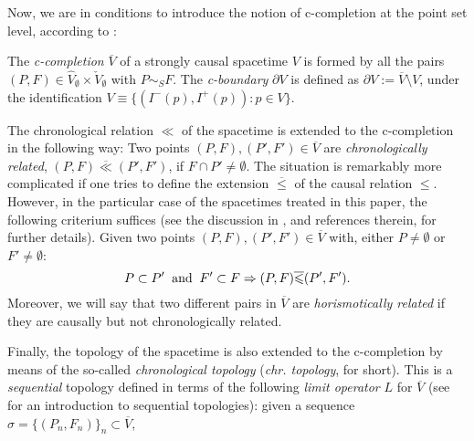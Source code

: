 Now, we are in conditions to introduce
the notion of c-completion at the point set level, according to \cite{FHSFinalDef}:
\begin{defi}\label{d1}
The {\em c-completion} $\overline{V}$ of a strongly causal spacetime $V$ is formed by all
the pairs $(P,F)\in
\hat{V}_{\emptyset}\times\check{V}_{\emptyset}$ with
$P\sim_{S} F$. The {\em c-boundary} $\partial V$ is defined as
$\partial V:=\overline{V}\setminus V$, under the identification $V\equiv
\{(I^{-}(p),I^{+}(p)): p\in V\}$.
\end{defi}

The chronological relation $\ll$ of the spacetime is extended to
the c-completion  in the following way: Two points $(P,F),
(P',F')\in \overline{V}$ are {\em chronologically related},
$(P,F)\overline{\ll} (P',F')$, if $F\cap P'\neq\emptyset$.
The situation is remarkably more complicated if one tries to define the extension $\overline{\leqslant}$ of the causal relation $\leqslant$. However, in the particular case of the spacetimes treated in this paper, the following criterium suffices (see the discussion in
\cite[Sect. 6.4]{FHSBuseman}, and references therein, for further details). Given two points $(P,F),
(P',F')\in \overline{V}$ with, either $P\neq\emptyset$ or $F'\neq
\emptyset$:
\[
P\subset P'\;\;\hbox{and}\;\; F'\subset F \Rightarrow
(P,F)\overline{\leqslant} (P',F').
\]
Moreover, we will
say that two different pairs in $\overline{V}$ are {\em
horismotically related} if they are causally but not
chronologically related.

\smallskip

Finally, the topology of the spacetime is also extended to the
c-completion by means of the so-called {\em chronological topology} ({\em chr. topology}, for short). This is a {\em sequential} topology defined
in terms of the following
{\em limit operator} $L$ for $\overline{V}$ (see \cite[Section 2]{FHSHaus} for an introduction to sequential topologies): given a sequence
$\sigma=\{(P_{n},F_{n})\}_n\subset\overline{V}$,

